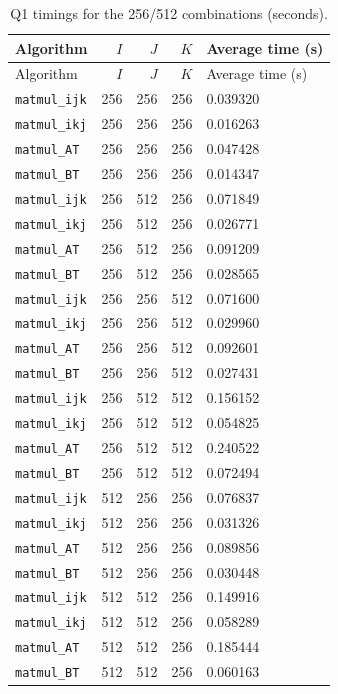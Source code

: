 \documentclass[11pt]{article}
\begin{document}
\begin{longtable}{@{}lrrrl@{}}
\caption{Q1 timings for the 256/512 combinations (seconds).}\label{tab:q1-small}\\
\toprule
Algorithm & $I$ & $J$ & $K$ & Average time (s) \\
\midrule
\endfirsthead
\toprule
Algorithm & $I$ & $J$ & $K$ & Average time (s) \\
\midrule
\endhead
\bottomrule
\endfoot
\texttt{matmul\_ijk} & 256 & 256 & 256 & 0.039320 \\
\texttt{matmul\_ikj} & 256 & 256 & 256 & 0.016263 \\
\texttt{matmul\_AT} & 256 & 256 & 256 & 0.047428 \\
\texttt{matmul\_BT} & 256 & 256 & 256 & 0.014347 \\
\texttt{matmul\_ijk} & 256 & 512 & 256 & 0.071849 \\
\texttt{matmul\_ikj} & 256 & 512 & 256 & 0.026771 \\
\texttt{matmul\_AT} & 256 & 512 & 256 & 0.091209 \\
\texttt{matmul\_BT} & 256 & 512 & 256 & 0.028565 \\
\texttt{matmul\_ijk} & 256 & 256 & 512 & 0.071600 \\
\texttt{matmul\_ikj} & 256 & 256 & 512 & 0.029960 \\
\texttt{matmul\_AT} & 256 & 256 & 512 & 0.092601 \\
\texttt{matmul\_BT} & 256 & 256 & 512 & 0.027431 \\
\texttt{matmul\_ijk} & 256 & 512 & 512 & 0.156152 \\
\texttt{matmul\_ikj} & 256 & 512 & 512 & 0.054825 \\
\texttt{matmul\_AT} & 256 & 512 & 512 & 0.240522 \\
\texttt{matmul\_BT} & 256 & 512 & 512 & 0.072494 \\
\texttt{matmul\_ijk} & 512 & 256 & 256 & 0.076837 \\
\texttt{matmul\_ikj} & 512 & 256 & 256 & 0.031326 \\
\texttt{matmul\_AT} & 512 & 256 & 256 & 0.089856 \\
\texttt{matmul\_BT} & 512 & 256 & 256 & 0.030448 \\
\texttt{matmul\_ijk} & 512 & 512 & 256 & 0.149916 \\
\texttt{matmul\_ikj} & 512 & 512 & 256 & 0.058289 \\
\texttt{matmul\_AT} & 512 & 512 & 256 & 0.185444 \\
\texttt{matmul\_BT} & 512 & 512 & 256 & 0.060163 \\

\end{longtable}
\end{document}
